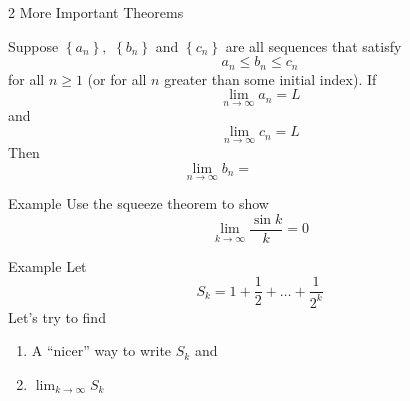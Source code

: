 \documentclass[presentation]{beamer}
\begin{document}
\begin{frame}[label={sec:org42f3b7e}]{2 More Important Theorems}
\begin{theorem}
Suppose \(\left\{ a_n \right\},\) \(\left\{ b_n \right\}\) and \(\left\{ c_n \right\}\)
are all sequences that satisfy
\[
a_n \le b_n \le c_n\]
for all \(n \ge 1\) (or for all \(n\) greater than some initial index).  If
\[
\lim_{n\rightarrow \infty} a_n = L\]
and
\[
\lim_{n\rightarrow \infty} c_n = L\]
Then
\[
\lim_{n\rightarrow \infty} b_n = \hspace{1in}\]
\end{theorem}
\end{frame}

\begin{frame}[label={sec:orgaef0936}]{Example}
Use the squeeze theorem to show
\[
\lim_{k\rightarrow \infty} \frac{\sin k}{k} = 0
\]
\vspace{10in}
\end{frame}

\begin{frame}[label={sec:orgfd2b24b}]{Example}
Let
\[
S_k = 1 + \frac{1}{2} + \ldots + \frac{1}{2^k}\]
Let's try to find
\begin{enumerate}
\item A ``nicer'' way to write \(S_k\) and
\item \(\lim_{k\rightarrow \infty} S_k\)
\end{enumerate}
\vspace{10in}
\end{frame}
\end{document}

